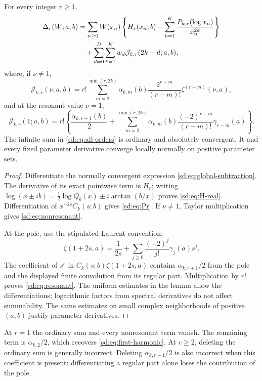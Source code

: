 \begin{theorem}
\label{sd:thm:all-orders}
For every integer $r\ge1$,
\begin{align}
 \Delta_r(W;a,b)
 &=\sum_{n\ge0}W(x_n)
       \left\{H_r(x_n;b)-\sum_{k=1}^{K}
                    \frac{P_{k,r}(\log x_n)}{x_n^{2k}}\right\}
       \notag\\
 &\quad+\sum_{d=0}^{D}\sum_{k=1}^{K}w_d\mathcal J_{k,r}(2k-d;a,b),
       \label{sd:eq:all-orders}
\end{align}
where, if $\nu\ne1$,
\begin{equation}\label{sd:eq:nonresonant}
 \mathcal J_{k,r}(\nu;a,b)=r!\sum_{m=2}^{\min(r,2k)}
   \alpha_{k,m}(b)\frac{2^{r-m}}{(r-m)!}
                       \zeta^{(r-m)}(\nu,a),
\end{equation}
and at the resonant value $\nu=1$,
\begin{equation}\label{sd:eq:resonant}
 \boxed{\displaystyle
 \mathcal J_{k,r}(1;a,b)=r!\left\{
   \frac{\alpha_{k,r+1}(b)}2+
   \sum_{m=2}^{\min(r,2k)}\alpha_{k,m}(b)
          \frac{(-2)^{r-m}}{(r-m)!}\gamma_{r-m}(a)\right\}.}
\end{equation}
The infinite sum in \eqref{sd:eq:all-orders} is ordinary and absolutely
convergent.  It and every fixed parameter derivative converge locally
normally on positive parameter sets.
\end{theorem}
\begin{proof}
Differentiate the normally convergent expression
\eqref{sd:eq:global-subtraction}.  The derivative of its exact pointwise
term is $H_r$; writing
$\log(x\pm ib)=\frac12\log Q_b(x)\pm i\arctan(b/x)$ proves
\eqref{sd:eq:H-real}.  Differentiation of $x^{-2s}C_k(s;b)$ gives
\eqref{sd:eq:Pr}.  If $\nu\ne1$, Taylor multiplication gives
\eqref{sd:eq:nonresonant}.

At the pole, use the stipulated Laurent convention:
\[
 \zeta(1+2s,a)=\frac1{2s}
       +\sum_{j\ge0}\frac{(-2)^j}{j!}\gamma_j(a)s^j.
\]
The coefficient of $s^r$ in $C_k(s;b)\zeta(1+2s,a)$ contains
$\alpha_{k,r+1}/2$ from the pole and the displayed finite convolution
from its regular part.  Multiplication by $r!$ proves
\eqref{sd:eq:resonant}.  The uniform estimates in the lemma allow
the differentiations; logarithmic factors from spectral derivatives
do not affect summability.  The same estimates on small complex
neighborhoods of positive $(a,b)$ justify parameter derivatives.
\end{proof}

At $r=1$ the ordinary sum and every nonresonant term vanish.  The
remaining term is $\alpha_{k,2}/2$, which recovers
\eqref{sd:eq:first-harmonic}.  At $r\ge2$, deleting the ordinary sum
is generally incorrect.  Deleting $\alpha_{k,r+1}/2$ is also
incorrect when this coefficient is present: differentiating a regular
part alone loses the contribution of the pole.

